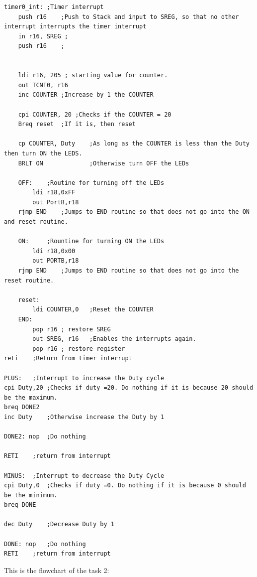 \documentclass[a4paper,12pt]{article}
\begin{document}
\begin{lstlisting}
timer0_int:	;Timer interrupt
	push r16	;Push to Stack and input to SREG, so that no other interrupt interrupts the timer interrupt
	in r16, SREG ;	
	push r16	;
	

	ldi r16, 205 ; starting value for counter.
	out TCNT0, r16
	inc COUNTER	;Increase by 1 the COUNTER

	cpi COUNTER, 20	;Checks if the COUNTER = 20
	Breq reset	;If it is, then reset
	
	cp COUNTER, Duty	;As long as the COUNTER is less than the Duty then turn ON the LEDS.
	BRLT ON				;Otherwise turn OFF the LEDs
	
	OFF:	;Routine for turning off the LEDs
		ldi r18,0xFF
		out PortB,r18
	rjmp END	;Jumps to END routine so that does not go into the ON and reset routine.

	ON:		;Rountine for turning ON the LEDs
		ldi r18,0x00
		out PORTB,r18
	rjmp END	;Jumps to END routine so that does not go into the reset routine.

	reset: 
		ldi COUNTER,0	;Reset the COUNTER
	END:	
		pop r16 ; restore SREG
		out SREG, r16	;Enables the interrupts again. 
		pop r16 ; restore register
reti	;Return from timer interrupt

PLUS:	;Interrupt to increase the Duty cycle
cpi Duty,20	;Checks if duty =20. Do nothing if it is because 20 should be the maximum.
breq DONE2
inc Duty	;Otherwise increase the Duty by 1

DONE2: nop	;Do nothing

RETI	;return from interrupt

MINUS:	;Interrupt to decrease the Duty Cycle 
cpi Duty,0	;Checks if duty =0. Do nothing if it is because 0 should be the minimum.
breq DONE

dec Duty	;Decrease Duty by 1

DONE: nop	;Do nothing
RETI	;return from interrupt
\end{lstlisting}
\newpage
This is the flowchart of the task 2:
\end{document}
